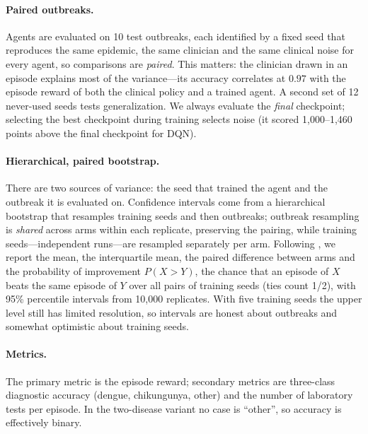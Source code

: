\documentclass[11pt,a4paper]{article}
\begin{document}
\paragraph{Paired outbreaks.} Agents are evaluated on 10 test outbreaks, each identified by a fixed seed that reproduces the same epidemic, the same clinician and the same clinical noise for every agent, so comparisons are \emph{paired}. This matters: the clinician drawn in an episode explains most of the variance---its accuracy correlates at $0.97$ with the episode reward of both the clinical policy and a trained agent. A second set of 12 never-used seeds tests generalization. We always evaluate the \emph{final} checkpoint; selecting the best checkpoint during training selects noise (it scored 1{,}000--1{,}460 points above the final checkpoint for DQN).

\paragraph{Hierarchical, paired bootstrap.} There are two sources of variance: the seed that trained the agent and the outbreak it is evaluated on. Confidence intervals come from a hierarchical bootstrap \cite{saravanan2020hierarchical} that resamples training seeds and then outbreaks; outbreak resampling is \emph{shared} across arms within each replicate, preserving the pairing, while training seeds---independent runs---are resampled separately per arm. Following \citet{agarwal2021precipice}, we report the mean, the interquartile mean, the paired difference between arms and the probability of improvement $P(X>Y)$, the chance that an episode of $X$ beats the same episode of $Y$ over all pairs of training seeds (ties count 1/2), with 95\% percentile intervals from 10{,}000 replicates. With five training seeds the upper level still has limited resolution, so intervals are honest about outbreaks and somewhat optimistic about training seeds.

\paragraph{Metrics.} The primary metric is the episode reward; secondary metrics are three-class diagnostic accuracy (dengue, chikungunya, other) and the number of laboratory tests per episode. In the two-disease variant no case is ``other'', so accuracy is effectively binary.
\end{document}
